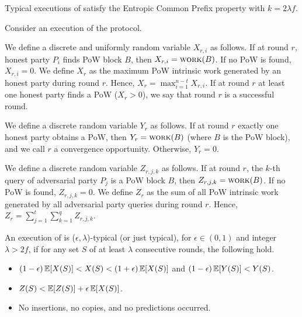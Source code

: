 \begin{conjecture}
  Typical executions of \poem satisfy the Entropic Common Prefix property
  with $k = 2 \lambda f$.
\end{conjecture}


Consider an execution of the \poem protocol.

We define a discrete and uniformly random variable $X_{r, i}$ as follows.
If at round $r$, honest party $P_i$ finds PoW block $B$, then $X_{r, i} = \textsc{work}(B)$.
If no PoW is found, $X_{r, i} = 0$. We define $X_{r}$ as the maximum PoW intrinsic work
generated by an honest party during round $r$. Hence, $X_{r} = \max_{i = 1}^{n - t}{X_{r,i}}$.
If at round $r$ at least one honest party finds a PoW ($X_r > 0$),
we say that round $r$ is a successful round.

We define a discrete random variable $Y_r$ as follows.
If at round $r$ exactly one honest party obtains a PoW, then $Y_r = \textsc{work}(B)$ (where $B$
is the PoW block), and we call $r$ a convergence opportunity.
Otherwise, $Y_r = 0$.

We define a discrete random variable $Z_{r, j, k}$ as follows.
If at round $r$, the $k$-th query of adversarial party $P_j$ is a PoW block $B$, then
$Z_{r, j, k} = \textsc{work}(B)$. If no PoW is found, $Z_{r, j, k} = 0$. We define $Z_{r}$ as
the sum of all PoW intrinsic work generated by all adversarial party queries
during round $r$. Hence, $Z_{r} = \sum_{j = 1}^{t}{ \sum_{k = 1}^{q}{ Z_{r, j, k} } }$.

\begin{definition}
  An execution of \poem is ($\epsilon,\lambda$)-typical (or just typical),
  for $\epsilon \in (0,1)$ and integer $\lambda > 2f$, if for any set $S$ of at
  least $\lambda$ consecutive rounds, the following hold.
  \begin{itemize}
    \item $(1 - \epsilon) \mathop{{}\mathbb{E}}[X(S)] < X(S) < (1 + \epsilon) \mathop{{}\mathbb{E}}[X(S)]$ and $(1-\epsilon) \mathop{{}\mathbb{E}}[Y(S)] < Y(S)$.
    \item $Z(S) < \mathop{{}\mathbb{E}}[Z(S)] + \epsilon\mathop{{}\mathbb{E}}[X(S)]$.
    \item No insertions, no copies, and no predictions occurred.
  \end{itemize}
\end{definition}

